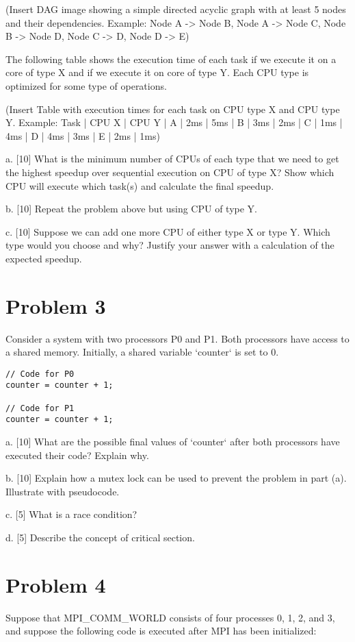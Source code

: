 \documentclass{article}
\begin{document}
(Insert DAG image showing a simple directed acyclic graph with at least 5 nodes and their dependencies.  Example: Node A -> Node B, Node A -> Node C, Node B -> Node D, Node C -> D, Node D -> E)

The following table shows the execution time of each task if we execute it on a core of type X and if we execute it on core of type Y. Each CPU type is optimized for some type of operations.

(Insert Table with execution times for each task on CPU type X and CPU type Y. Example:  Task | CPU X | CPU Y  |  A | 2ms | 5ms | B | 3ms | 2ms | C | 1ms | 4ms | D | 4ms | 3ms | E | 2ms | 1ms)

a. [10] What is the minimum number of CPUs of each type that we need to get the highest speedup over sequential execution on CPU of type X? Show which CPU will execute which task(s) and calculate the final speedup.

b. [10] Repeat the problem above but using CPU of type Y.

c. [10]  Suppose we can add one more CPU of either type X or type Y. Which type would you choose and why?  Justify your answer with a calculation of the expected speedup.


\section*{Problem 3}
Consider a system with two processors P0 and P1. Both processors have access to a shared memory.  Initially, a shared variable `counter` is set to 0.

\begin{verbatim}
// Code for P0
counter = counter + 1;

// Code for P1
counter = counter + 1;
\end{verbatim}

a. [10] What are the possible final values of `counter` after both processors have executed their code? Explain why.

b. [10] Explain how a mutex lock can be used to prevent the problem in part (a).  Illustrate with pseudocode.

c. [5] What is a race condition?

d. [5] Describe the concept of critical section.


\section*{Problem 4}
Suppose that MPI\_COMM\_WORLD consists of four processes 0, 1, 2, and 3, and suppose the following code is executed after MPI has been initialized:
\end{document}
